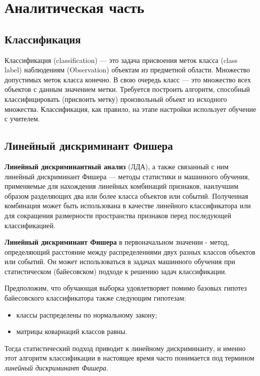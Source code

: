 \chapter{Аналитическая часть}

\section{Классификация}

Классификация (classification) — это задача присвоения меток класса
(class label) наблюдениям (Observation) объектам из предметной области.
Множество допустимых меток класса конечно. В свою очередь класс —
это множество всех объектов с данным значением метки. Требуется
построить алгоритм, способный классифицировать (присвоить метку)
произвольный объект из исходного множества. Классификация, как
правило, на этапе настройки использует обучение с учителем.

\section{Линейный дискриминант Фишера}

\textbf{Линейный дискриминантный анализ} (ЛДА), а также связанный с ним
линейный дискриминант Фишера --- методы статистики и машинного обучения,
применяемые для нахождения линейных комбинаций признаков, наилучшим
образом разделяющих два или более класса объектов или событий. Полученная
комбинация может быть использована в качестве линейного классификатора или
для сокращения размерности пространства признаков перед последующей
классификацией.

\textbf{Линейный дискриминант Фишера} в первоначальном значении - метод,
определяющий расстояние между распределениями двух разных классов объектов
или событий. Он может использоваться в задачах машинного обучения при
статистическом (байесовском) подходе к решению задач классификации.

Предположим, что обучающая выборка удовлетворяет помимо базовых
гипотез байесовского классификатора также следующим гипотезам:
\begin{itemize}[label*=---]
	\item классы распределены по нормальному закону;
	\item матрицы ковариаций классов равны.
\end{itemize}
Тогда статистический подход приводит к линейному дискриминанту, и именно
этот алгоритм классификации в настоящее время часто понимается под термином
\textit{линейный дискриминант Фишера}.



\clearpage
